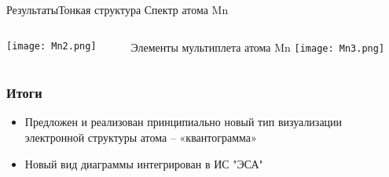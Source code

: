 \documentclass{beamer}
\begin{document}
\begin{frame}{Результаты}{Тонкая структура}
Спектр атома Mn
\begin{columns}
    \begin{column}{0.5\textwidth}
    \texttt{[image: Mn2.png]}
    \end{column}
    \begin{column}{0.5\textwidth}
    Элементы мультиплета атома Mn
    \texttt{[image: Mn3.png]}
    \end{column}
  \end{columns}
\end{frame}

\begin{frame}
\frametitle{Итоги}
    \begin{itemize}
        \item Предложен и реализован принципиально новый тип визуализации электронной структуры атома – «квантограмма»

        \item Новый вид диаграммы интегрирован в ИС "ЭСА"
    \end{itemize}
\end{frame}
\end{document}
